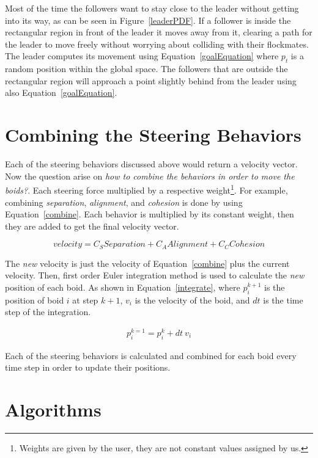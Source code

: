 Most of the time the followers want to stay close to the leader without getting into its way, as can be seen in Figure~\ref{leaderPDF}.  If a follower is inside the rectangular region in front of the leader it moves away from it, clearing a path for the leader to move freely without worrying about colliding with their flockmates. The leader computes its movement using Equation~\ref{goalEquation} where $p_t$ is a random position within the global space. The followers that are outside the rectangular region will approach a point slightly behind from the leader using also Equation~\ref{goalEquation}.

\section{Combining the Steering Behaviors}
Each of the steering behaviors discussed above would return a velocity vector. Now the question arise on \textit{how to combine the behaviors in order to move the boids?}. Each steering force multiplied by a respective weight\footnote{Weights are given by the user, they are not constant values assigned by us.}. For example, combining \textit{separation}, \textit{alignment}, and \textit{cohesion} is done by using Equation~\ref{combine}. Each behavior is multiplied by its constant weight, then they are added to get the final velocity vector.

\begin{equation}
\label{combine}
velocity = C_S Separation  + C_A Alignment  + C_C Cohesion 
\end{equation}

The \textit{new} velocity is just the velocity of Equation~\ref{combine} plus the current velocity. Then, first order Euler integration method is used  to calculate the \textit{new} position of each boid. As shown in Equation~\ref{integrate}, where $p_i^{k+1}$ is the position of boid $i$ at step $k+1$, $v_i$ is the velocity of the boid, and $dt$ is the time step of the integration.

\begin{align}
\label{integrate}
p_i^{k=1} = p_i^k + dt~ v_i
\end{align}

Each of the steering behaviors is calculated and combined for each boid every time step in order to update their positions.

\section{Algorithms}

